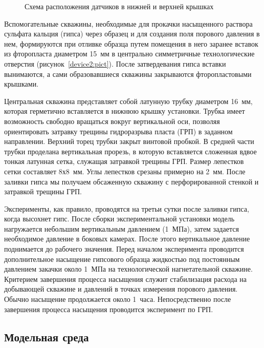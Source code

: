 \begin{figure}[hb]
\begin{center}
\end{center}
\caption{Схема расположения датчиков в нижней и верхней крышках}\label{device3:pict}
\end{figure}

Вспомогательные скважины, необходимые для прокачки насыщенного раствора сульфата кальция (гипса) через образец и для создания поля порового давления в нем, формируются при отливке образца путем помещения в него заранее вставок из фторопласта диаметром 15~мм в центрально симметричные технологические отверстия (рисунок~\ref{device2:pict}). После затвердевания гипса вставки вынимаются, а сами образовавшиеся скважины закрываются фторопластовыми крышками.

Центральная скважина представляет собой латунную трубку диаметром 16~мм, которая герметично вставляется в нижнюю крышку установки. Трубка имеет возможность свободно вращаться вокруг вертикальной оси, позволяя ориентировать затравку трещины гидроразрыва пласта (ГРП) в заданном направлении. Верхний торец трубки закрыт винтовой пробкой. В средней части трубки проделана вертикальная прорезь, в которую вставляется сложенная вдвое тонкая латунная сетка, служащая затравкой трещины ГРП. Размер лепестков сетки составляет 8х8~мм. Углы лепестков срезаны примерно на 2~мм. После заливки гипса мы получаем обсаженную скважину с перфорированной стенкой и затравкой трещины ГРП.

Эксперименты, как правило, проводятся на третьи сутки после заливки гипса, когда высохнет гипс. После сборки экспериментальной установки модель нагружается небольшим вертикальным давлением (1~МПа), затем задается необходимое давление в боковых камерах. После этого вертикальное давление поднимается до рабочего значения. Перед началом эксперимента проводится дополнительное насыщение гипсового образца жидкостью под постоянным давлением закачки около 1~МПа на технологической нагнетательной скважине. Критерием завершения процесса насыщения служит стабилизация расхода на добывающей скважине и давлений в точках измерения порового давления. Обычно насыщение продолжается около 1~часа. Непосредственно после завершения процесса насыщения проводится эксперимент по ГРП.

\subsection{Модельная среда}

